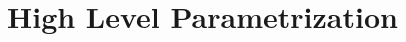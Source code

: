 \documentclass[../main.tex]{subfiles}
\begin{document}
\section{High Level Parametrization} \label{highLevel}
\end{document}
